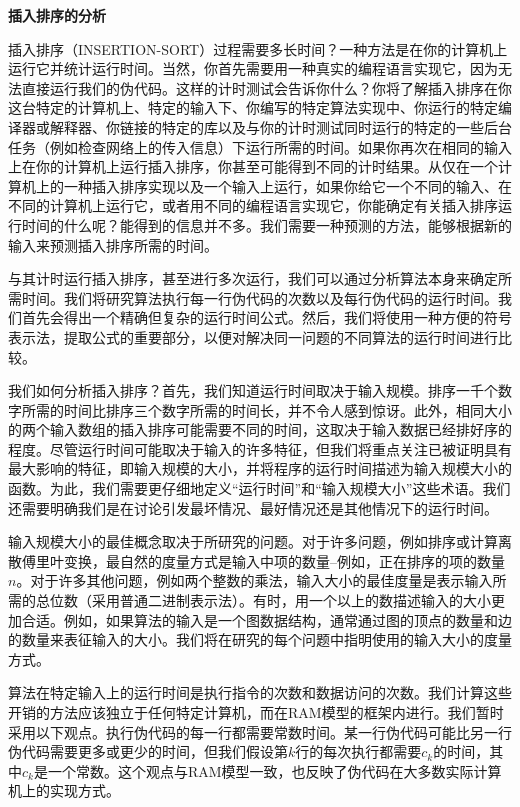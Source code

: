 \documentclass[lang=cn,newtx,10pt,scheme=chinese]{elegantbook}
\begin{document}
\textbf{插入排序的分析}

插入排序（INSERTION-SORT）过程需要多长时间？一种方法是在你的计算机上运行它并统计运行时间。当然，你首先需要用一种真实的编程语言实现它，因为无法直接运行我们的伪代码。这样的计时测试会告诉你什么？你将了解插入排序在你这台特定的计算机上、特定的输入下、你编写的特定算法实现中、你运行的特定编译器或解释器、你链接的特定的库以及与你的计时测试同时运行的特定的一些后台任务（例如检查网络上的传入信息）下运行所需的时间。如果你再次在相同的输入上在你的计算机上运行插入排序，你甚至可能得到不同的计时结果。从仅在一个计算机上的一种插入排序实现以及一个输入上运行，如果你给它一个不同的输入、在不同的计算机上运行它，或者用不同的编程语言实现它，你能确定有关插入排序运行时间的什么呢？能得到的信息并不多。我们需要一种预测的方法，能够根据新的输入来预测插入排序所需的时间。

与其计时运行插入排序，甚至进行多次运行，我们可以通过分析算法本身来确定所需时间。我们将研究算法执行每一行伪代码的次数以及每行伪代码的运行时间。我们首先会得出一个精确但复杂的运行时间公式。然后，我们将使用一种方便的符号表示法，提取公式的重要部分，以便对解决同一问题的不同算法的运行时间进行比较。

我们如何分析插入排序？首先，我们知道运行时间取决于输入规模。排序一千个数字所需的时间比排序三个数字所需的时间长，并不令人感到惊讶。此外，相同大小的两个输入数组的插入排序可能需要不同的时间，这取决于输入数据已经排好序的程度。尽管运行时间可能取决于输入的许多特征，但我们将重点关注已被证明具有最大影响的特征，即输入规模的大小，并将程序的运行时间描述为输入规模大小的函数。为此，我们需要更仔细地定义``运行时间''和``输入规模大小''这些术语。我们还需要明确我们是在讨论引发最坏情况、最好情况还是其他情况下的运行时间。

输入规模大小的最佳概念取决于所研究的问题。对于许多问题，例如排序或计算离散傅里叶变换，最自然的度量方式是输入中项的数量--例如，正在排序的项的数量$n$。对于许多其他问题，例如两个整数的乘法，输入大小的最佳度量是表示输入所需的总位数（采用普通二进制表示法）。有时，用一个以上的数描述输入的大小更加合适。例如，如果算法的输入是一个图数据结构，通常通过图的顶点的数量和边的数量来表征输入的大小。我们将在研究的每个问题中指明使用的输入大小的度量方式。

算法在特定输入上的运行时间是执行指令的次数和数据访问的次数。我们计算这些开销的方法应该独立于任何特定计算机，而在RAM模型的框架内进行。我们暂时采用以下观点。执行伪代码的每一行都需要常数时间。某一行伪代码可能比另一行伪代码需要更多或更少的时间，但我们假设第$k$行的每次执行都需要$c_k$的时间，其中$c_k$是一个常数。这个观点与RAM模型一致，也反映了伪代码在大多数实际计算机上的实现方式。
\end{document}
